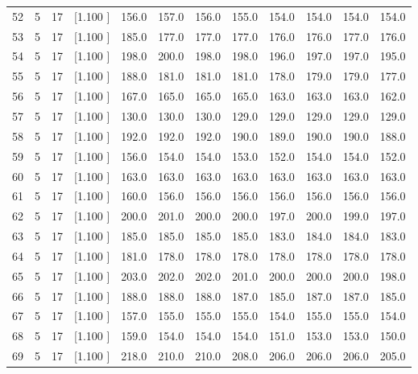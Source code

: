 \documentclass[12pt,a4paper]{article}
\begin{document}
\begin{center}
{\begin{tabular}{r r r r r r r r r r r r}
  52&  5& 17&[1.100     ]&   156.0&   157.0&   156.0&   155.0&   154.0&   154.0&   154.0&   154.0\\[-0.02in]
  53&  5& 17&[1.100     ]&   185.0&   177.0&   177.0&   177.0&   176.0&   176.0&   177.0&   176.0\\[-0.02in]
  54&  5& 17&[1.100     ]&   198.0&   200.0&   198.0&   198.0&   196.0&   197.0&   197.0&   195.0\\[-0.02in]
  55&  5& 17&[1.100     ]&   188.0&   181.0&   181.0&   181.0&   178.0&   179.0&   179.0&   177.0\\[-0.02in]
  56&  5& 17&[1.100     ]&   167.0&   165.0&   165.0&   165.0&   163.0&   163.0&   163.0&   162.0\\[-0.02in]
  57&  5& 17&[1.100     ]&   130.0&   130.0&   130.0&   129.0&   129.0&   129.0&   129.0&   129.0\\[-0.02in]
  58&  5& 17&[1.100     ]&   192.0&   192.0&   192.0&   190.0&   189.0&   190.0&   190.0&   188.0\\[-0.02in]
  59&  5& 17&[1.100     ]&   156.0&   154.0&   154.0&   153.0&   152.0&   154.0&   154.0&   152.0\\[-0.02in]
  60&  5& 17&[1.100     ]&   163.0&   163.0&   163.0&   163.0&   163.0&   163.0&   163.0&   163.0\\[-0.02in]
  61&  5& 17&[1.100     ]&   160.0&   156.0&   156.0&   156.0&   156.0&   156.0&   156.0&   156.0\\[-0.02in]
  62&  5& 17&[1.100     ]&   200.0&   201.0&   200.0&   200.0&   197.0&   200.0&   199.0&   197.0\\[-0.02in]
  63&  5& 17&[1.100     ]&   185.0&   185.0&   185.0&   185.0&   183.0&   184.0&   184.0&   183.0\\[-0.02in]
  64&  5& 17&[1.100     ]&   181.0&   178.0&   178.0&   178.0&   178.0&   178.0&   178.0&   178.0\\[-0.02in]
  65&  5& 17&[1.100     ]&   203.0&   202.0&   202.0&   201.0&   200.0&   200.0&   200.0&   198.0\\[-0.02in]
  66&  5& 17&[1.100     ]&   188.0&   188.0&   188.0&   187.0&   185.0&   187.0&   187.0&   185.0\\[-0.02in]
  67&  5& 17&[1.100     ]&   157.0&   155.0&   155.0&   155.0&   154.0&   155.0&   155.0&   154.0\\[-0.02in]
  68&  5& 17&[1.100     ]&   159.0&   154.0&   154.0&   154.0&   151.0&   153.0&   153.0&   150.0\\[-0.02in]
  69&  5& 17&[1.100     ]&   218.0&   210.0&   210.0&   208.0&   206.0&   206.0&   206.0&   205.0\\[-0.02in]

\end{tabular}}
\end{center}
\end{document}
